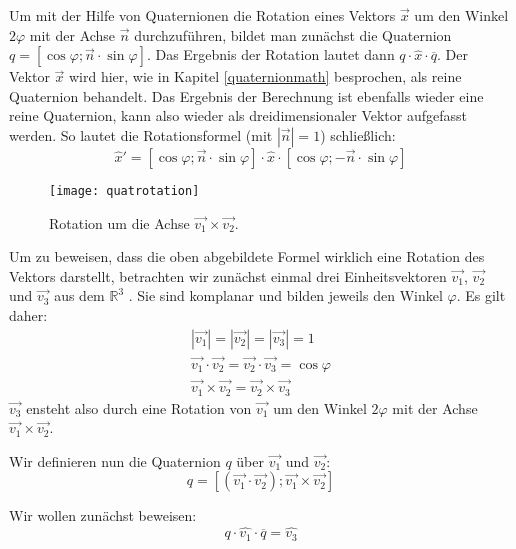 Um mit der Hilfe von Quaternionen die Rotation eines Vektors $\vec x$ um den Winkel $2 \varphi$ mit der Achse $\vec n$ durchzuführen, bildet man zunächst die Quaternion $q = \left[ \cos \varphi; \vec n \cdot \sin \varphi \right]$. Das Ergebnis der Rotation lautet dann $q \cdot \hat{x} \cdot \overline{q}$. Der Vektor $\vec x$ wird hier, wie in Kapitel \ref{quaternionmath} besprochen, als reine Quaternion behandelt. Das Ergebnis der Berechnung ist ebenfalls wieder eine reine Quaternion, kann also wieder als dreidimensionaler Vektor aufgefasst werden. So lautet die Rotationsformel (mit $\left| \vec{n} \right| = 1$) schließlich:
\begin{equation}
 \hat{x}' = \left[ \cos \varphi; \vec n \cdot \sin \varphi \right] \cdot \hat{x} \cdot \left[ \cos \varphi; -\vec n \cdot \sin \varphi \right]
\end{equation}

\begin{wrapfigure}{R}{0.4\textwidth}
  \vspace{-10pt}
  \texttt{[image: quatrotation]}
  \vspace{-15pt}
  \caption{Rotation um die Achse $\vec{v_1} \times \vec{v_2}$.}
\end{wrapfigure}

Um zu beweisen, dass die oben abgebildete Formel wirklich eine Rotation des Vektors darstellt, betrachten wir zunächst einmal drei Einheitsvektoren $\vec{v_1}$, $\vec{v_2}$ und $\vec{v_3}$ aus dem $\mathbb R^3$ . Sie sind komplanar und bilden jeweils den Winkel $\varphi$. Es gilt daher:
\begin{align}
 \left| \vec{v_1} \right| = \left| \vec{v_2} \right| = \left| \vec{v_3} \right| = 1 \\
 \vec{v_1} \cdot \vec{v_2} = \vec{v_2} \cdot \vec{v_3} = \cos \varphi \label{dotsame} \\
 \vec{v_1} \times\vec{v_2} = \vec{v_2} \times \vec{v_3} \label{crosssame}
\end{align}
$\vec{v_3}$ ensteht also durch eine Rotation von $\vec{v_1}$ um den Winkel $2 \varphi$ mit der Achse $\vec{v_1} \times \vec{v_2}$.

Wir definieren nun die Quaternion $q$ über $\vec{v_1}$ und $\vec{v_2}$:
\begin{equation}
 q = \left[ \left( \vec{v_1} \cdot \vec{v_2} \right); \vec{v_1} \times \vec{v_2} \right]
\end{equation} 

Wir wollen zunächst beweisen:
\begin{equation}
 \label{quaternionclaim}
 q \cdot \hat{v_1} \cdot \overline{q} = \hat{v_3}
\end{equation} 

